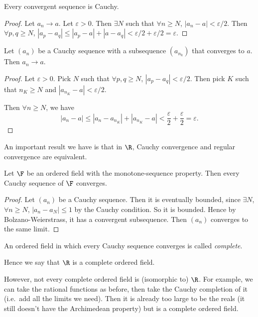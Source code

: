 \documentclass[a4paper]{article}
\begin{document}
\begin{lemma}
  Every convergent sequence is Cauchy.
\end{lemma}

\begin{proof}
  Let $a_n \to a$. Let $\varepsilon > 0$. Then $\exists N$ such that $\forall n \geq N$, $|a_n - a| < \varepsilon/2$. Then $\forall p, q\geq N$, $|a_p - a_q| \leq |a_p - a| + |a - a_q| < \varepsilon/2 + \varepsilon/2 = \varepsilon$.
\end{proof}

\begin{lemma}
  Let $(a_n)$ be a Cauchy sequence with a subsequence $(a_{n_k})$ that converges to $a$. Then $a_n\to a$.
\end{lemma}

\begin{proof}
  Let $\varepsilon > 0$. Pick $N$ such that $\forall p, q\geq N$, $|a_p - a_q| < \varepsilon/2$. Then pick $K$ such that $n_K \geq N$ and $|a_{n_K} - a| < \varepsilon/2$.

  Then $\forall n \geq N$, we have
  \[
    |a_n - a| \leq |a_n - a_{n_K}| + |a_{n_K} - a| < \frac{\varepsilon}{2} + \frac{\varepsilon}{2} = \varepsilon.
  \]
\end{proof}

An important result we have is that in $\R$, Cauchy convergence and regular convergence are equivalent.
\begin{thm}
  Let $\F$ be an ordered field with the monotone-sequence property. Then every Cauchy sequence of $\F$ converges.
\end{thm}

\begin{proof}
Let $(a_n)$ be a Cauchy sequence. Then it is eventually bounded, since $\exists N$, $\forall n \geq N$, $|a_n - a_N| \leq 1$ by the Cauchy condition. So it is bounded. Hence by Bolzano-Weierstrass, it has a convergent subsequence. Then $(a_n)$ converges to the same limit.
\end{proof}

\begin{defi}
  An ordered field in which every Cauchy sequence converges is called \emph{complete}.
\end{defi}

Hence we say that $\R$ is a complete ordered field.

However, not every complete ordered field is (isomorphic to) $\R$. For example, we can take the rational functions as before, then take the Cauchy completion of it (i.e.\ add all the limits we need). Then it is already too large to be the reals (it still doesn't have the Archimedean property) but is a complete ordered field.
\end{document}
